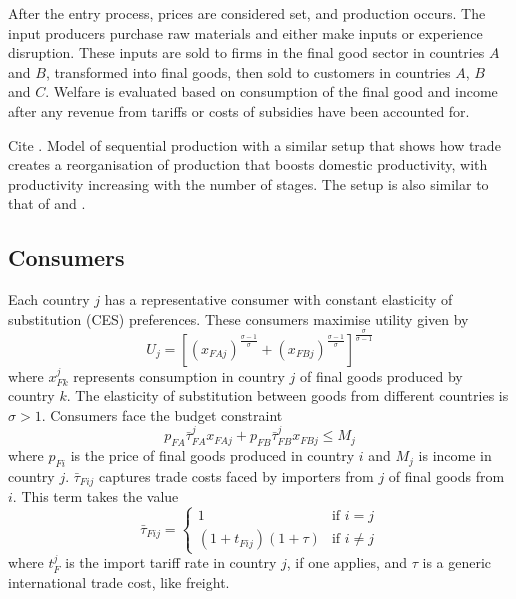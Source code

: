 \documentclass{article}
\begin{document}
After the entry process, prices are considered set, and production occurs. The input producers purchase raw materials and either make inputs or experience disruption. These inputs are sold to firms in the final good sector in countries $A$ and $B$, transformed into final goods, then sold to customers in countries $A$, $B$ and $C$. Welfare is evaluated based on consumption of the final good and income after any revenue from tariffs or costs of subsidies have been accounted for.

Cite \textcite{melitz_missing_2014}. Model of sequential production with a similar setup that shows how trade creates a reorganisation of production that boosts domestic productivity, with productivity increasing with the number of stages. The setup is also similar to that of \textcite{bagwell_design_2016} and \textcite{venables_trade_1987}.

\subsection{Consumers}
 
Each country $j$ has a representative consumer with constant elasticity of substitution (CES) preferences. These consumers maximise utility given by
\begin{equation}
    U_j = \left[ (x_{FAj})^{\frac{\sigma - 1}{\sigma}} + (x_{FBj})^{\frac{\sigma - 1}{\sigma}} \right]^{\frac{\sigma}{\sigma - 1}}
\end{equation}
where $x_{Fk}^j$ represents consumption in country $j$ of final goods produced by country $k$. The elasticity of substitution between goods from different countries is $\sigma > 1$. Consumers face the budget constraint 
\begin{equation}
    p_{FA} \bar{\tau}^{j}_{FA} x_{FAj} + p_{FB} \bar{\tau}^{j}_{FB} x_{FBj} \leq M_j
\end{equation}
where $p_{Fi}$ is the price of final goods produced in country $i$ and $M_j$ is income in country $j$. $\bar{\tau}_{Fij}$ captures trade costs faced by importers from $j$ of final goods from $i$. This term takes the value 
\begin{equation} \label{eq:tau}
    \bar{\tau}_{Fij} =
    \begin{cases}
        1 &\text{if } i = j \\
        (1 + t_{Fij})(1 + \tau) &\text{if } i \neq j
    \end{cases}
\end{equation}
where $t^j_{F}$ is the import tariff rate in country $j$, if one applies, and $\tau$ is a generic international trade cost, like freight. 
\end{document}
